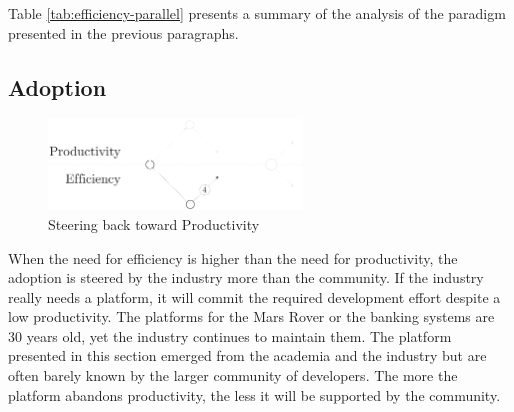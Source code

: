 Table \ref{tab:efficiency-parallel} presents a summary of the analysis of the paradigm presented in the previous paragraphs.








\subsection{Adoption} \label{chapter3:software-efficiency:adoption}

\begin{figure}[!h]
\begin{center}
\includegraphics[width=0.6\textwidth]{../ressources/state-of-the-art-4.pdf}
\end{center}
\caption{Steering back toward Productivity}
\label{fig:state-of-the-art-4}
\end{figure}


When the need for efficiency is higher than the need for productivity, the adoption is steered by the industry more than the community.
If the industry really needs a platform, it will commit the required development effort despite a low productivity.
The platforms for the Mars Rover or the banking systems are 30 years old, yet the industry continues to maintain them.
The platform presented in this section emerged from the academia and the industry but are often barely known by the larger community of developers.
The more the platform abandons productivity, the less it will be supported by the community.





